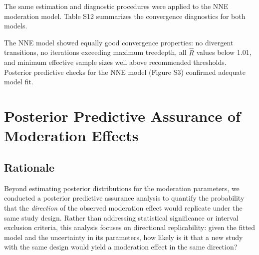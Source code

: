 \documentclass[
  english,
  man,floatsintext]{apa6}
\begin{document}
The same estimation and diagnostic procedures were applied to the NNE moderation model. Table S12 summarizes the convergence diagnostics for both models.

\begin{table}[H]
\centering
\caption{\label{tab:table-s11-diagnostics-comparison}Convergence diagnostics summary for F0 and NNE moderation models.}
\centering
{}
\end{table}

The NNE model showed equally good convergence properties: no divergent transitions, no iterations exceeding maximum treedepth, all \(\hat{R}\) values below 1.01, and minimum effective sample sizes well above recommended thresholds. Posterior predictive checks for the NNE model (Figure S3) confirmed adequate model fit.

\newpage

\section{Posterior Predictive Assurance of Moderation Effects}\label{posterior-predictive-assurance-of-moderation-effects}

\subsection{Rationale}\label{rationale}

Beyond estimating posterior distributions for the moderation parameters, we conducted a posterior predictive assurance analysis to quantify the probability that the \emph{direction} of the observed moderation effect would replicate under the same study design. Rather than addressing statistical significance or interval exclusion criteria, this analysis focuses on directional replicability: given the fitted model and the uncertainty in its parameters, how likely is it that a new study with the same design would yield a moderation effect in the same direction?
\end{document}
